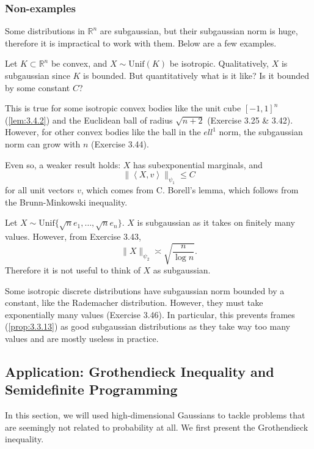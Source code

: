 \subsubsection{Non-examples}
Some distributions in $\mathbb{R}^n$ are subgaussian, but their subgaussian norm is huge, therefore it is 
impractical to work with them. Below are a few examples.

\begin{example}
\label{ex:3.4.6}
Let $K \subset \mathbb{R}^n$ be convex, and $X \sim \mathrm{Unif}(K)$ be isotropic. Qualitatively, $X$ is 
subgaussian since $K$ is bounded. But quantitatively what is it like? Is it bounded by some constant $C$?

This is true for some isotropic convex bodies like the unit cube $[-1, 1]^n$ (\cref{lem:3.4.2}) and 
the Euclidean ball of radius $\sqrt{n + 2}$ (Exercise 3.25 \& 3.42). However, for other convex bodies like the 
ball in the $ell^1$ norm, the subgaussian norm can grow with $n$ (Exercise 3.44).

Even so, a weaker result holds: $X$ has subexponential marginals, and 
\[ \lVert \left\langle X, v \right\rangle \rVert_{\psi_1} \leq C \]
for all unit vectors $v$, which comes from C. Borell's lemma, which follows from the Brunn-Minkowski inequality.
\end{example}

\begin{example}
\label{ex:3.4.7}
Let $X \sim \mathrm{Unif}\{\sqrt{n}e_1, \dots, \sqrt{n}e_n\}$. $X$ is subgaussian as it takes on finitely 
many values. However, from Exercise 3.43, 
\[ \lVert X \rVert_{\psi_2} \asymp \sqrt{\frac{n}{\log{n}}}. \]
Therefore it is not useful to think of $X$ as subgaussian.
\end{example}

\begin{example}
\label{ex:3.4.8}
Some isotropic discrete distributions have subgaussian norm bounded by a constant, like the Rademacher 
distribution. However, they must take exponentially many values (Exercise 3.46). In particular, this prevents 
frames (\cref{prop:3.3.13}) as good subgaussian distributions as they take way too many values and are mostly 
useless in practice.
\end{example}


\subsection{Application: Grothendieck Inequality and Semidefinite Programming}
In this section, we will used high-dimensional Gaussians to tackle problems that are seemingly not related 
to probability at all. We first present the Grothendieck inequality.

